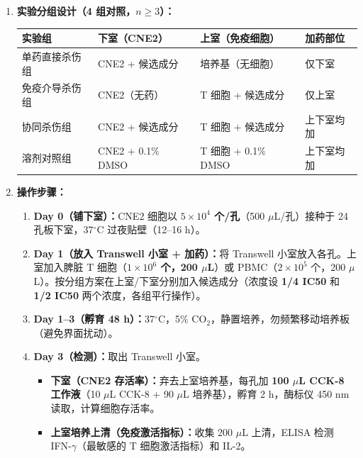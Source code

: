 \documentclass[12pt,a4paper,twoside]{article}
\begin{document}
\begin{enumerate}
  \item \textbf{实验分组设计（4 组对照，$n \geq 3$）：}

  \begin{center}
  \begin{tabular}{p{3.2cm}p{3.5cm}p{3.5cm}p{2.5cm}}
  \toprule
  \textbf{实验组} & \textbf{下室（CNE2）} & \textbf{上室（免疫细胞）} & \textbf{加药部位} \\
  \midrule
  单药直接杀伤组 & CNE2 + 候选成分 & 培养基（无细胞） & 仅下室 \\
  \addlinespace
  免疫介导杀伤组 & CNE2（无药） & T 细胞 + 候选成分 & 仅上室 \\
  \addlinespace
  协同杀伤组 & CNE2 + 候选成分 & T 细胞 + 候选成分 & 上下室均加 \\
  \addlinespace
  溶剂对照组 & CNE2 + 0.1\% DMSO & T 细胞 + 0.1\% DMSO & 上下室均加 \\
  \bottomrule
  \end{tabular}
  \end{center}

  \item \textbf{操作步骤：}
  \begin{enumerate}
    \item \textbf{Day 0（铺下室）：}CNE2 细胞以 \textbf{$5 \times 10^4$ 个/孔}（500 $\mu$L/孔）接种于 24 孔板下室，37$^{\circ}$C 过夜贴壁（12--16 h）。
    \item \textbf{Day 1（放入 Transwell 小室 + 加药）：}将 Transwell 小室放入各孔。上室加入脾脏 T 细胞（\textbf{$1 \times 10^6$ 个，200 $\mu$L}）或 PBMC（$2 \times 10^5$ 个，200 $\mu$L）。按分组方案在上室/下室分别加入候选成分（浓度设 \textbf{1/4 IC50} 和 \textbf{1/2 IC50} 两个浓度，各组平行操作）。
    \item \textbf{Day 1--3（孵育 48 h）：}37$^{\circ}$C，5\% CO$_2$，静置培养，勿频繁移动培养板（避免界面扰动）。
    \item \textbf{Day 3（检测）：}取出 Transwell 小室。
    \begin{itemize}
      \item \textbf{下室（CNE2 存活率）：}弃去上室培养基，每孔加 \textbf{100 $\mu$L CCK-8 工作液}（10 $\mu$L CCK-8 + 90 $\mu$L 培养基），孵育 2 h，酶标仪 450 nm 读取，计算细胞存活率。
      \item \textbf{上室培养上清（免疫激活指标）：}收集 200 $\mu$L 上清，ELISA 检测 IFN-$\gamma$（最敏感的 T 细胞激活指标）和 IL-2。
    \end{itemize}
  \end{enumerate}


\end{enumerate}
\end{document}
